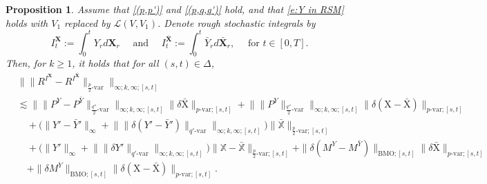 \documentclass[11pt,reqno]{amsart}
\newtheorem{proposition}[lemma]{Proposition}
\numberwithin{equation}{section}
\begin{document}
\begin{proposition}\label{prop:estim of integral'}
Assume that \ref{(p,p')} and \ref{(p,q,q')} hold, and that \eqref{e:Y in RSM} holds with $V_1$ replaced by $\mathscr L(V,V_1)$. Denote rough stochastic integrals by 
\begin{equation*}
I^{\mathbf X}_t := \int_{0}^{t}Y_{r} d\mathbf X_{r} \quad \text{ and  } \quad I^{\bar{\mathbf X}}_{t} := \int_{0}^{t}\bar Y_{r}d\bar{\mathbf X}_r,  \quad \text{ for } t \in [0,T].
\end{equation*}
Then, for $k \ge 1$, it holds that for all $(s,t) \in \Delta$, 
\begin{align}\nonumber
&\big\| \| R^{I^{\mathbf X}} - R^{I^{\bar{ \mathbf X}}} \|_{\frac{p}{2}\text{-}\mathrm{var}} \big\|_{\infty;k,\infty;[s,t]}\\ \nonumber 
&\lesssim \big\| \| P^Y - P^{\bar Y}\|_{\frac{q''}{2}\text{-}\mathrm{var}} \big\|_{\infty;k,\infty;[s,t]} \|\delta \bar{\mathrm X} \|_{p\text{-}\mathrm{var};[s,t]} + \big\| \|P^Y\|_{\frac{q''}{2}\text{-}\mathrm{var}} \big\|_{\infty;k,\infty;[s,t]} \|\delta( \mathrm X - \bar{\mathrm X} )\|_{p\text{-}\mathrm{var};[s,t]} \\ \label{e:esti for R - R 1}
&\quad + \big( \|Y' - \bar Y'\|_{\infty} + \big\| \|\delta(Y' - \bar Y')\|_{q'\text{-}\mathrm{var}} \big\|_{\infty;k,\infty;[s,t]} \big) \| \bar{\mathbb X} \|_{\frac{p}{2}\text{-}\mathrm{var};[s,t]}
\\ \nonumber 
&\quad + \big(\|Y'\|_{\infty} + \big\| \|\delta Y'\|_{q'\text{-}\mathrm{var}} \big\|_{\infty;k,\infty;[s,t]} \big) \| \mathbb X - \bar{\mathbb X} \|_{\frac{p}{2}\text{-}\mathrm{var};[s,t]} +  \|\delta (M^Y - M^{\bar Y})\|_{\mathrm{BMO};[s,t]} \|\delta \bar{\mathrm X}\|_{p\text{-}\mathrm{var};[s,t]} \\ \nonumber
&\quad + \|\delta M^Y\|_{\mathrm{BMO};[s,t]} \|\delta (\mathrm X - \bar{\mathrm X})\|_{p\text{-}\mathrm{var};[s,t]}. 
\end{align}
\end{proposition}
\end{document}
